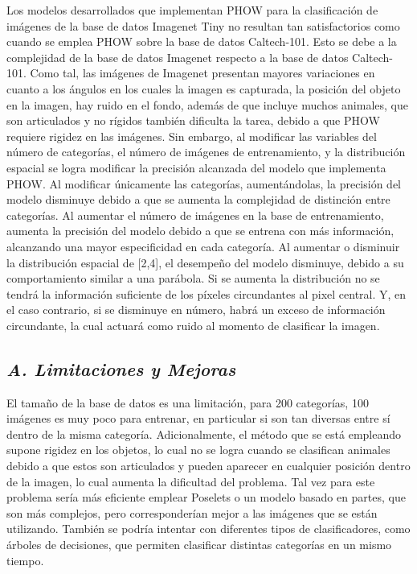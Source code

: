 \documentclass[10pt,twocolumn,letterpaper]{article}
\begin{document}
Los modelos desarrollados que implementan PHOW para la clasificación de imágenes de la base de datos Imagenet Tiny no resultan tan satisfactorios como cuando se emplea PHOW sobre la base de datos Caltech-101. Esto se debe a la complejidad de la base de datos Imagenet respecto a la base de datos Caltech-101. Como tal, las imágenes de Imagenet presentan mayores variaciones en cuanto a los ángulos en los cuales la imagen es capturada, la posición del objeto en la imagen, hay ruido en el fondo, además de que incluye muchos animales, que son articulados y no rígidos también dificulta la tarea, debido a que PHOW requiere rigidez en las imágenes. 
Sin embargo, al modificar las variables del número de categorías, el número de imágenes de entrenamiento, y la distribución espacial se logra modificar la precisión alcanzada del modelo que implementa PHOW. Al modificar únicamente las categorías, aumentándolas, la precisión del modelo disminuye debido a que se aumenta la complejidad de distinción entre categorías. Al aumentar el número de imágenes en la base de entrenamiento, aumenta la precisión del modelo debido a que se entrena con más información, alcanzando una mayor especificidad en cada categoría. 
Al aumentar o disminuir la distribución espacial de [2,4], el desempeño del modelo disminuye, debido a su comportamiento similar a una parábola. Si se aumenta la distribución no se tendrá la información suficiente de los píxeles circundantes al pixel central. Y, en el caso contrario, si se disminuye en número, habrá un exceso de información circundante, la cual actuará como ruido al momento de clasificar la imagen. 
\subsection{ \textit{A. Limitaciones y Mejoras}}

El tamaño de la base de datos es una limitación, para 200 categorías, 100 imágenes es muy poco para entrenar, en particular si son tan diversas entre sí dentro de la misma categoría. Adicionalmente, el método que se está empleando supone rigidez en los objetos, lo cual no se logra cuando se clasifican animales debido a que estos son articulados y pueden aparecer en cualquier posición dentro de la imagen, lo cual aumenta la dificultad del problema. Tal vez para este problema sería más eficiente emplear Poselets o un modelo basado en partes, que son más complejos, pero corresponderían mejor a las imágenes que se están utilizando. También se podría intentar con diferentes tipos de clasificadores, como árboles de decisiones, que permiten clasificar distintas categorías en un mismo tiempo.
\end{document}
